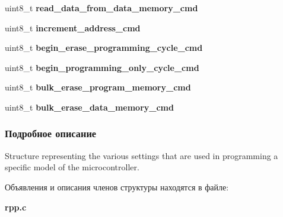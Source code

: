 \begin{DoxyCompactItemize}
\mbox{\label{structpicmicro_a647c43e155726c5d60fa1de64225e41a}} 
uint8\+\_\+t {\bfseries read\+\_\+data\+\_\+from\+\_\+data\+\_\+memory\+\_\+cmd}
\item 
\mbox{\label{structpicmicro_afc7f848a7e299a6f69bf06b8c832263e}} 
uint8\+\_\+t {\bfseries increment\+\_\+address\+\_\+cmd}
\item 
\mbox{\label{structpicmicro_a7c4a28b78ad75fb79a65d07e5c17517d}} 
uint8\+\_\+t {\bfseries begin\+\_\+erase\+\_\+programming\+\_\+cycle\+\_\+cmd}
\item 
\mbox{\label{structpicmicro_a83170f1168928c2f802f033eeed43610}} 
uint8\+\_\+t {\bfseries begin\+\_\+programming\+\_\+only\+\_\+cycle\+\_\+cmd}
\item 
\mbox{\label{structpicmicro_ae44fcc9a55a11ae7a893b1fcb26a5c68}} 
uint8\+\_\+t {\bfseries bulk\+\_\+erase\+\_\+program\+\_\+memory\+\_\+cmd}
\item 
\mbox{\label{structpicmicro_a046e1acb07283c54a3944d9350d594fc}} 
uint8\+\_\+t {\bfseries bulk\+\_\+erase\+\_\+data\+\_\+memory\+\_\+cmd}
\end{DoxyCompactItemize}


\subsubsection{Подробное описание}
Structure representing the various settings that are used in programming a specific model of the microcontroller. 

Объявления и описания членов структуры находятся в файле\+:\begin{DoxyCompactItemize}
\item 
\textbf{ rpp.\+c}\end{DoxyCompactItemize}
